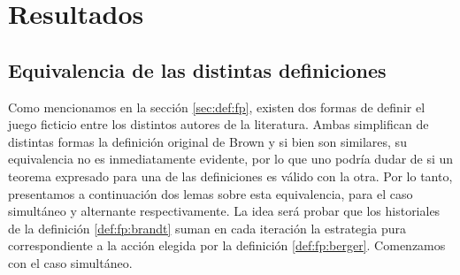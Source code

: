 \chapter{Resultados}  \label{cap:aportes}

\section{Equivalencia de las distintas definiciones}

Como mencionamos en la sección \ref{sec:def:fp}, existen dos formas de definir el juego ficticio entre los distintos autores de la literatura. Ambas simplifican de distintas formas la definición original de Brown y si bien son similares, su equivalencia no es inmediatamente evidente, por lo que uno podría dudar de si un teorema expresado para una de las definiciones es válido con la otra. Por lo tanto, presentamos a continuación dos lemas sobre esta equivalencia, para el caso simultáneo y alternante respectivamente. La idea será probar que los historiales de la definición \ref{def:fp:brandt} suman en cada iteración la estrategia pura correspondiente a la acción elegida por la definición \ref{def:fp:berger}. Comenzamos con el caso simultáneo.

